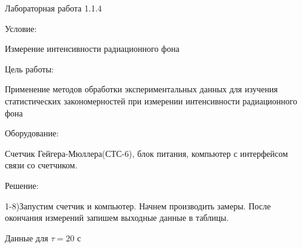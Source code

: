 \documentclass{astroedu-lab}
\begin{document}
\pagestyle{plain}

\begin{problem}{\large Лабораторная работа 1.1.4}

\begin{bfseries}
	Условие:
\end{bfseries}

Измерение интенсивности радиационного фона

\begin{bfseries}
	Цель работы:
\end{bfseries}

Применение методов обработки экспериментальных данных для изучения статистических закономерностей при измерении интенсивности радиационного фона

\begin{bfseries}
	Оборудование:
\end{bfseries}

Счетчик Гейгера-Мюллера(СТС-6), блок питания, компьютер с интерфейсом связи со счетчиком.

\begin{bfseries}
	Решение:
\end{bfseries}

1-8)Запустим счетчик и компьютер. Начнем производить замеры. После окончания измерений запишем выходные данные в таблицы.

\begin{center}
Данные для $\tau = 20$ с


\end{center}
\end{problem}
\end{document}
